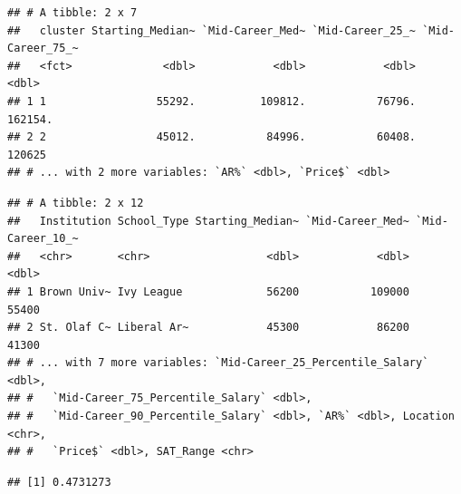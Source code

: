 \documentclass[]{article}
\newenvironment{Shaded}{\begin{snugshade}}{\end{snugshade}}
\newcommand{\KeywordTok}[1]{\textcolor[rgb]{0.13,0.29,0.53}{\textbf{#1}}}
\newcommand{\DataTypeTok}[1]{\textcolor[rgb]{0.13,0.29,0.53}{#1}}
\newcommand{\StringTok}[1]{\textcolor[rgb]{0.31,0.60,0.02}{#1}}
\newcommand{\OperatorTok}[1]{\textcolor[rgb]{0.81,0.36,0.00}{\textbf{#1}}}
\newcommand{\NormalTok}[1]{#1}
\begin{document}
\begin{Shaded}
\end{Shaded}

\begin{verbatim}
## # A tibble: 2 x 7
##   cluster Starting_Median~ `Mid-Career_Med~ `Mid-Career_25_~ `Mid-Career_75_~
##   <fct>              <dbl>            <dbl>            <dbl>            <dbl>
## 1 1                 55292.          109812.           76796.          162154.
## 2 2                 45012.           84996.           60408.          120625 
## # ... with 2 more variables: `AR%` <dbl>, `Price$` <dbl>
\end{verbatim}

\begin{Shaded}
\end{Shaded}

\begin{verbatim}
## # A tibble: 2 x 12
##   Institution School_Type Starting_Median~ `Mid-Career_Med~ `Mid-Career_10_~
##   <chr>       <chr>                  <dbl>            <dbl>            <dbl>
## 1 Brown Univ~ Ivy League             56200           109000            55400
## 2 St. Olaf C~ Liberal Ar~            45300            86200            41300
## # ... with 7 more variables: `Mid-Career_25_Percentile_Salary` <dbl>,
## #   `Mid-Career_75_Percentile_Salary` <dbl>,
## #   `Mid-Career_90_Percentile_Salary` <dbl>, `AR%` <dbl>, Location <chr>,
## #   `Price$` <dbl>, SAT_Range <chr>
\end{verbatim}

\begin{Shaded}
\end{Shaded}

\begin{verbatim}
## [1] 0.4731273
\end{verbatim}
\end{document}
